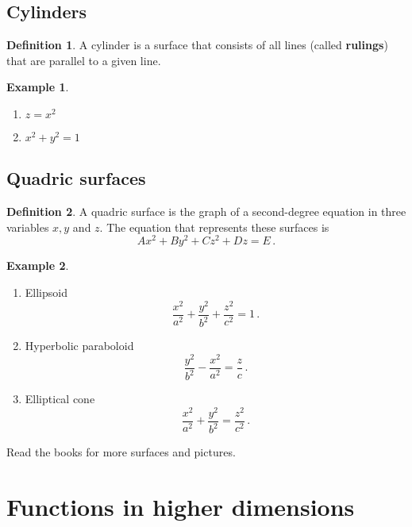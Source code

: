 \documentclass[
]{book}
\providecommand{\tightlist}{%
  \setlength{\itemsep}{0pt}\setlength{\parskip}{0pt}}
\theoremstyle{definition}
\newtheorem{definition}{Definition}[chapter]
\theoremstyle{definition}
\newtheorem{example}{Example}[chapter]
\theoremstyle{definition}
\theoremstyle{definition}
\theoremstyle{remark}
\begin{document}
\hypertarget{cylinders}{%
\section{Cylinders}\label{cylinders}}

\begin{definition}
A cylinder is a surface that consists of all lines (called \textbf{rulings}) that
are parallel to a given line.
\end{definition}

\begin{example}
\leavevmode

\begin{enumerate}
\def\labelenumi{\arabic{enumi}.}
\tightlist
\item
  \(z = x^2\)
\item
  \(x^2 + y^2 = 1\)
\end{enumerate}

\end{example}

\hypertarget{quadric-surfaces}{%
\section{Quadric surfaces}\label{quadric-surfaces}}

\begin{definition}
A quadric surface is the graph of a second-degree equation in three variables
\(x,y\) and \(z\).
The equation that represents these surfaces is
\[Ax^2 + By^2 + Cz^2 + Dz = E\,.\]
\end{definition}

\begin{example}
\leavevmode

\begin{enumerate}
\def\labelenumi{\arabic{enumi}.}
\item
  Ellipsoid
  \[\frac{x^2}{a^2} + \frac{y^2}{b^2} + \frac{z^2}{c^2} = 1\,. \]
\item
  Hyperbolic paraboloid
  \[\frac{y^2}{b^2} - \frac{x^2}{a^2} = \frac{z}{c} \,.\]
\item
  Elliptical cone
  \[\frac{x^2}{a^2} + \frac{y^2}{b^2} = \frac{z^2}{c^2} \,.\]
\end{enumerate}

Read the books for more surfaces and pictures.

\end{example}

\newpage

\hypertarget{functions-in-higher-dimensions}{%
\chapter{Functions in higher dimensions}\label{functions-in-higher-dimensions}}
\end{document}
